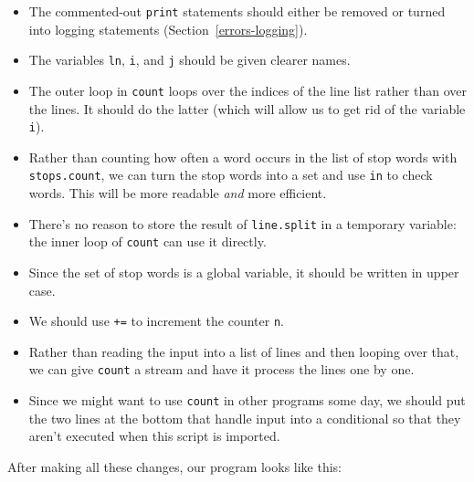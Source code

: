 \documentclass[
]{krantz}
\begin{document}
\begin{itemize}
\item
  The commented-out \texttt{print} statements should either be removed
  or turned into logging statements (Section~\ref{errors-logging}).
\item
  The variables \texttt{ln}, \texttt{i}, and \texttt{j} should be given clearer names.
\item
  The outer loop in \texttt{count} loops over the indices of the line list
  rather than over the lines.
  It should do the latter
  (which will allow us to get rid of the variable \texttt{i}).
\item
  Rather than counting how often a word occurs in the list of stop words with \texttt{stops.count},
  we can turn the stop words into a set and use \texttt{in} to check words.
  This will be more readable \emph{and} more efficient.
\item
  There's no reason to store the result of \texttt{line.split} in a temporary variable:
  the inner loop of \texttt{count} can use it directly.
\item
  Since the set of stop words is a global variable,
  it should be written in upper case.
\item
  We should use \texttt{+=} to increment the counter \texttt{n}.
\item
  Rather than reading the input into a list of lines and then looping over that,
  we can give \texttt{count} a stream and have it process the lines one by one.
\item
  Since we might want to use \texttt{count} in other programs some day,
  we should put the two lines at the bottom that handle input into a conditional
  so that they aren't executed when this script is imported.
\end{itemize}

After making all these changes,
our program looks like this:
\end{document}
